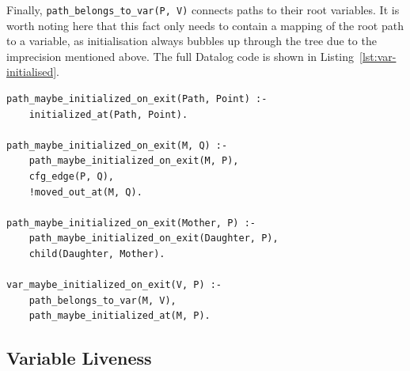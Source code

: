 \documentclass[11pt,a4paper,twoside,openany,draft]{report}
\newenvironment{sourcecode}{\captionsetup{type=listing}}{}
\newcommand{\InDatalog}[1]{\texttt{#1}}
\begin{document}
Finally, \InDatalog{path_belongs_to_var(P, V)} connects paths to their root
variables. It is worth noting here that this fact only needs to contain a
mapping of the root path to a variable, as initialisation always bubbles up
through the tree due to the imprecision mentioned above. The full Datalog code
is shown in Listing~\ref{lst:var-initialised}.

\begin{sourcecode}
  \label{lst:var-initialised}
\begin{verbatim}
path_maybe_initialized_on_exit(Path, Point) :- 
    initialized_at(Path, Point).

path_maybe_initialized_on_exit(M, Q) :-
    path_maybe_initialized_on_exit(M, P),
    cfg_edge(P, Q),
    !moved_out_at(M, Q).

path_maybe_initialized_on_exit(Mother, P) :-
    path_maybe_initialized_on_exit(Daughter, P),
    child(Daughter, Mother).

var_maybe_initialized_on_exit(V, P) :-
    path_belongs_to_var(M, V),
    path_maybe_initialized_at(M, P).
\end{verbatim}
\end{sourcecode}

\subsection{Variable Liveness}
\label{sec:var-livenes}
\end{document}
